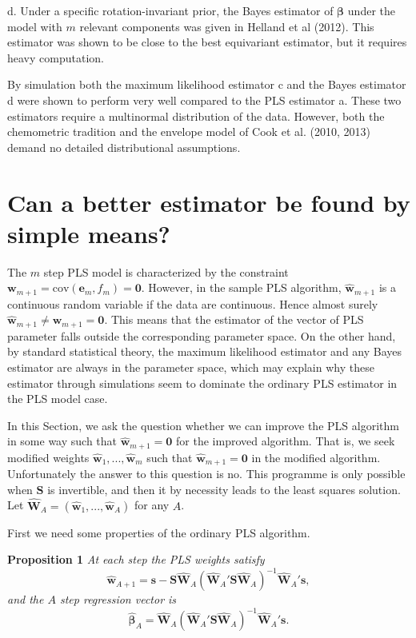 \documentclass[11pt]{article}
\begin{document}
d. Under a specific rotation-invariant prior, the Bayes estimator of $\bm{\beta}$ under the model with $m$ relevant components was given in Helland et al 
(2012). This estimator was shown to be close to the best equivariant estimator, but it requires heavy computation.
\smallskip

By simulation both the maximum likelihood estimator c and the Bayes estimator d were shown to perform very well compared to the PLS estimator a. These two estimators require a multinormal distribution of the data. However, both the chemometric tradition and the envelope model of 
Cook et al. (2010, 2013) demand no detailed distributional assumptions. 



\section{Can a better estimator be found by simple means?}

The $m$ step PLS model is characterized by the constraint $\bm{w}_{m+1}=\mathrm{cov}(\bm{e}_m ,f_m)=\bm{0}$. However, in the sample PLS algorithm, $\widehat{\bm{w}}_{m+1}$ is a continuous random variable if the data are continuous. Hence almost surely $\widehat{\bm{w}}_{m+1}\ne\bm{w}_{m+1}=\bm{0}$. This means that the estimator of the vector of PLS parameter falls outside the corresponding parameter space. On the other hand, by standard statistical theory, the maximum likelihood estimator and any Bayes estimator are always in the parameter space, which may explain why these estimator through simulations seem to dominate the ordinary PLS estimator in the PLS model case.

In this Section, we ask the question whether we can improve the PLS algorithm in some way such that $\widehat{\bm{w}}_{m+1}=\bm{0}$ for the improved algorithm. That is, we seek modified weights $\widehat{\bm{w}}_{1},...,\widehat{\bm{w}}_{m}$ such that $\widehat{\bm{w}}_{m+1}=\bm{0}$ in the modified algorithm. Unfortunately the answer to this question is no. This programme is only possible when $\bm{S}$ is invertible, and then it by necessity leads to the least squares solution. Let $\widehat{\bm{W}}_A=(\widehat{\bm{w}}_1,...,\widehat{\bm{w}}_A)$ for any $A$.

First we need some properties of the ordinary PLS algorithm.
\bigskip

\textbf{Proposition 1} \textit{At each step the PLS weights satisfy}
\begin{equation}
\widehat{\bm{w}}_{A+1}=\bm{s}-\bm{S}\widehat{\bm{W}}_{A}(\widehat{\bm{W}}_{A}'\bm{S}\widehat{\bm{W}}_{A})^{-1}\widehat{\bm{W}}_{A}'\bm{s},
\label{weight}
\end{equation}
\textit{and the $A$ step regression vector is}
\begin{equation}
\widehat{\bm{\beta}}_{A}=\widehat{\bm{W}}_{A}(\widehat{\bm{W}}_{A}'\bm{S}\widehat{\bm{W}}_{A})^{-1}\widehat{\bm{W}}_{A}'\bm{s}.
\label{regression}
\end{equation}
\smallskip
\end{document}
